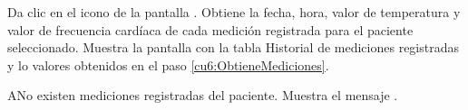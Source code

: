 \begin{UCtrayectoria}
	\UCpaso[\UCactor] Da clic en el icono \btnMonitoreo{} de la pantalla .
	\UCpaso[\UCsist] \label{cu6:ObtieneMediciones}Obtiene la fecha, hora, valor de temperatura y valor de frecuencia cardíaca de cada medición registrada para el paciente seleccionado. 
	\UCpaso[\UCsist] Muestra la pantalla  con la tabla Historial de mediciones registradas y lo valores obtenidos en el paso \ref{cu6:ObtieneMediciones}.
\end{UCtrayectoria}


\begin{UCtrayectoriaA}{A}{No existen mediciones registradas del paciente.}
	\UCpaso[\UCsist] Muestra el mensaje .
\end{UCtrayectoriaA}
